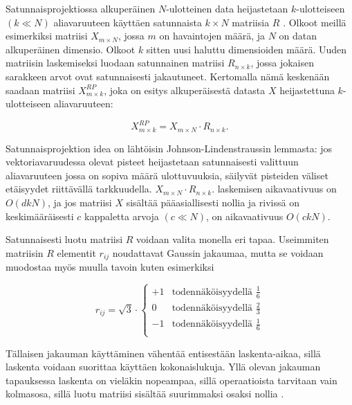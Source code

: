 Satunnaisprojektiossa alkuperäinen $N$-ulotteinen data heijastetaan $k$-ulotteiseen\\ $(k \ll N)$ aliavaruuteen käyttäen satunnaista $k \times N$ matriisia $R$ \cite{Random}. Olkoot meillä esimerkiksi matriisi 
$X_{m\times N}$, jossa $m$ on havaintojen määrä, ja $N$ on datan alkuperäinen dimensio. Olkoot  $k$  sitten uusi haluttu dimensioiden määrä. Uuden matriisin laskemiseksi luodaan satunnainen matriisi 
$R_{n \times k}$, jossa jokaisen sarakkeen arvot ovat satunnaisesti jakautuneet. Kertomalla nämä keskenään saadaan matriisi $X_{m \times k}^{RP}$, joka on esitys alkuperäisestä datasta $X$ heijastettuna $k$-ulotteiseen 
aliavaruuteen:

\begin{equation}
X_{m \times k}^{RP} = X_{m \times N} \cdot R_{n \times k}.
\label{RP}
\end{equation}

Satunnaisprojektion idea on lähtöisin Johnson-Lindenstraussin lemmasta: jos vektoriavaruudessa olevat pisteet heijastetaan satunnaisesti valittuun aliavaruuteen jossa on sopiva määrä ulottuvuuksia, säilyvät pisteiden
väliset etäisyydet riittävällä tarkkuudella. $X_{m \times N} \cdot R_{n \times k}.$ laskemisen aikavaativuus on $O(dkN)$, ja jos matriisi $X$ sisältää pääasiallisesti nollia ja rivissä on keskimääräisesti $c$ kappaletta arvoja 
$(c \ll N)$, on aikavaativuus $O(ckN)$.

Satunnaisesti luotu matriisi $R$ voidaan valita monella eri tapaa. Useimmiten matriisin $R$ elementit $r_{ij}$ noudattavat Gaussin jakaumaa, mutta se voidaan muodostaa myös muulla tavoin kuten esimerkiksi

\begin{equation}
r_{ij} = \sqrt{3}\cdot 
\begin{cases}
 +1 &\text{todennäköisyydellä $\frac{1}{6}$} \\
 0 &\text{todennäköisyydellä $\frac{2}{3}$} \\
 -1 &\text{todennäköisyydellä $\frac{1}{6}$} \\
\end{cases}
\label{RPChoice}
\end{equation}

Tällaisen jakauman käyttäminen vähentää entisestään laskenta-aikaa, sillä laskenta voidaan suorittaa käyttäen kokonaislukuja. Yllä olevan jakauman tapauksessa laskenta on vieläkin nopeampaa, sillä operaatioista
tarvitaan vain kolmasosa, sillä luotu matriisi sisältää suurimmaksi osaksi nollia \cite{Random}.
